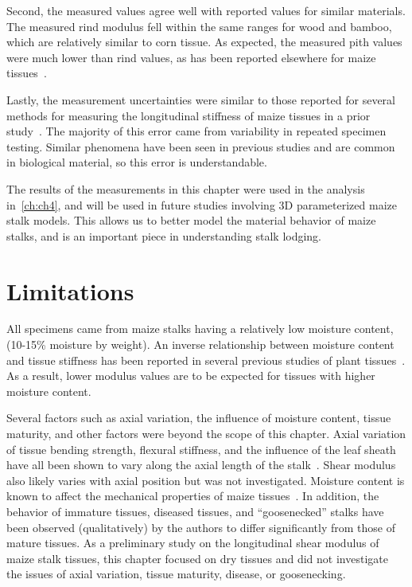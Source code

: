 Second, the measured values agree well with reported values for similar materials. The measured rind modulus fell within the same ranges for wood and bamboo, which are relatively similar to corn tissue. As expected, the measured pith values were much lower than rind values, as has been reported elsewhere for maize tissues~.

Lastly, the measurement uncertainties were similar to those reported for several methods for measuring the longitudinal stiffness of maize tissues in a prior study~. The majority of this error came from variability in repeated specimen testing. Similar phenomena have been seen in previous studies and are common in biological material, so this error is understandable.

The results of the measurements in this chapter were used in the analysis in~\cref{ch:ch4}, and will be used in future studies involving 3D parameterized maize stalk models. This allows us to better model the material behavior of maize stalks, and is an important piece in understanding stalk lodging.

\section{Limitations}
\label{ch3:limitations}
All specimens came from maize stalks having a relatively low moisture content, (10-15\% moisture by weight). An inverse relationship between moisture content and tissue stiffness has been reported in several previous studies of plant tissues~. As a result, lower modulus values are to be expected for tissues with higher moisture content.

Several factors such as axial variation, the influence of moisture content, tissue maturity, and other factors were beyond the scope of this chapter. Axial variation of  tissue bending strength, flexural stiffness, and the influence of the leaf sheath have all been shown to vary along the axial length of the stalk~.  Shear modulus also likely varies with axial position but was not investigated. Moisture content is known to affect the mechanical properties of maize tissues~. In addition, the behavior of immature tissues, diseased tissues, and “goosenecked” stalks have been observed (qualitatively) by the authors to differ significantly from those of mature tissues. As a preliminary study on the longitudinal shear modulus of maize stalk tissues, this chapter focused on dry tissues and did not investigate the issues of axial variation, tissue maturity, disease, or goosenecking.